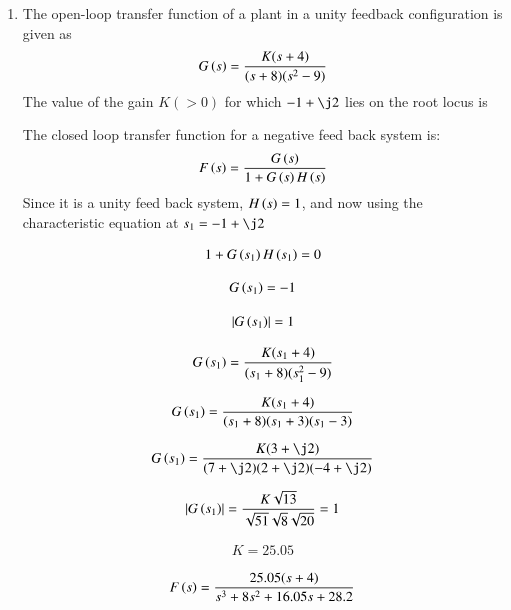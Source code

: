 \begin{enumerate}[label=\thesection.\arabic*.,ref=\thesection.\theenumi]

\item
 The open-loop transfer function of a plant in a unity feedback configuration is given as 
\begin{equation}
    G\left(s\right) = \frac{K(s+4)}{(s+8)(s^{2}-9)}
\end{equation}
 The value of the gain $K(>0)$ for which $-1 + \j2$ lies on the root locus is


\solution
  The closed loop transfer function for a negative feed back system is:
  \begin{equation}
      F\left(s\right) = \frac{G\left(s\right)}{1+G\left(s\right)H\left(s\right)}
  \end{equation}
Since it is a unity feed back system, $H\left(s\right) = 1$, and now using the characteristic equation at $s_{1} = -1 + \j2$

\begin{align}
1 + G\left(s_{1}\right)H\left(s_{1}\right) = 0
\end{align}

\begin{align}
    G\left(s_{1}\right) = -1
\end{align}

\begin{align}
    \left\vert G\left(s_{1}\right)\right\vert = 1
\end{align}


\begin{align}
    G\left(s_{1}\right) = \frac{K(s_{1}+4)}{(s_{1}+8)(s_{1}^{2}-9)}
\end{align}

\begin{align}
    G\left(s_{1}\right) = \frac{K(s_{1}+4)}{(s_{1}+8)(s_{1}+3)(s_{1}-3)}
\end{align}

\begin{align}
    G\brak{s_{1}} = \frac{K(3+\j2)}{(7+\j2)(2+\j2)(-4+\j2)}
\end{align}

\begin{align}
    \left\vert G\left(s_{1}\right)\right\vert = \frac{K\sqrt{13}}{\sqrt{51}\sqrt{8}\sqrt{20}} = 1
\end{align}

\begin{align}
    K = 25.05
\end{align}


\begin{align}
    F\left(s\right) = \frac{25.05(s+4)}{s^{3}+8s^{2}+16.05s+28.2}
\end{align}


\end{enumerate}
